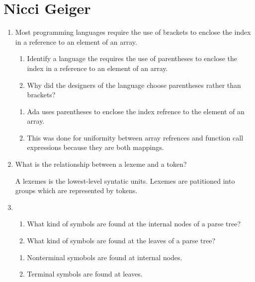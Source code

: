 
\chapter{Nicci Geiger}

\begin{enumerate}
  \item Most programming languages require the use of brackets to
    enclose the index in a reference to an element of an array.
  \begin{enumerate}
    \item Identify a language the requires the use of parentheses
      to enclose the index in a reference to an element of an array.
    \item Why did the designers of the language choose parentheses
      rather than brackets?
    \end{enumerate}

  \begin{answer}

  \begin{enumerate}
    \item Ada uses parentheses to enclose the index refrence to the
      element of an array.
    \item This was done for uniformity between array refrences and
      function call expressions because they are both mappings.
    \end{enumerate}

    \end{answer}
    
  \item What is the relationship between a lexeme and a token?

  \begin{answer}

    A lexemes is the lowest-level syntatic units.  Lexemes are
    patitioned into groups which are represented by tokens.
    \end{answer}

  \item
  \begin{enumerate}
    \item What kind of symbols are found at the internal nodes of a
      parse tree?
    \item What kind of symbols are found at the leaves of a parse tree?
    \end{enumerate}

  \begin{answer}

  \begin{enumerate}
    \item Nonterminal symobols are found at internal nodes.
    \item Terminal symbols  are found at leaves.
    \end{enumerate}


\end{answer}
\end{enumerate}
